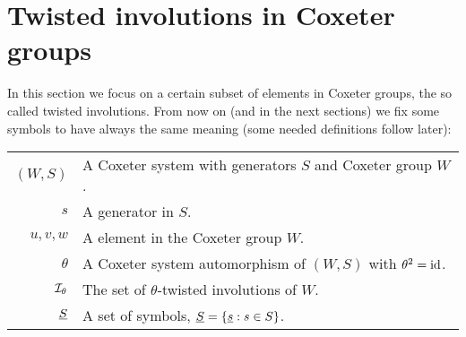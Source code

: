 \chapter[Twisted involutions]{Twisted involutions in Coxeter groups}
\label{sec:twisted-involutions}

In this section we focus on a certain subset of elements in Coxeter groups, the so called twisted involutions. From now on (and in the next sections) we fix some symbols to have always the same meaning (some needed definitions follow later):

\vspace*{1em}

\begin{tabular}{rl}
	$(W,S)$			& A Coxeter system with generators $S$ and Coxeter group $W$.\\
	$s$				& A generator in $S$.\\
	$u,v,w$			& A element in the Coxeter group $W$.\\
	$\theta$		& A Coxeter system automorphism of $(W,S)$ with $\theta^2 = \operatorname{id}$.\\
	$\mathcal{I}_{\theta}$	& The set of $\theta$-twisted involutions of $W$.\\
	$\underline{S}$			& A set of symbols, $\underline{S} = \{ \underline{s} : s \in S \}$.\\
\end{tabular}





